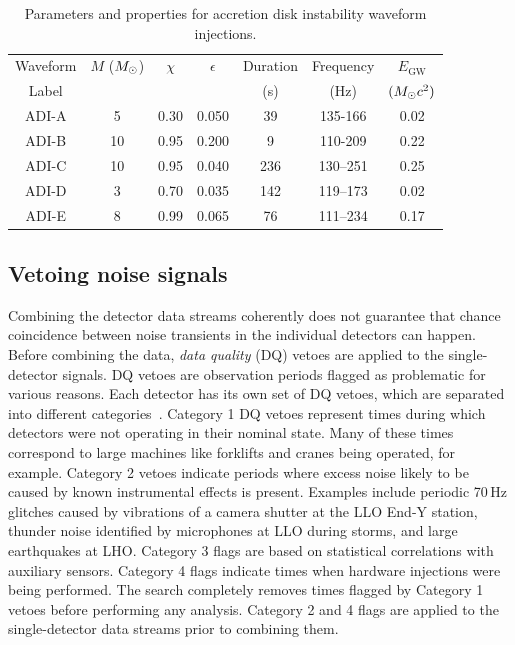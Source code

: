 \begin{table}[h!]
	\centering
	\caption
  {Parameters and properties for accretion disk instability waveform injections.
  \label{tab:adi}}
	\begin{tabular}{c c c c c c c}
		\hline
		Waveform & $M$ ($M_{\odot}$) & $\chi$ & $\epsilon$ & Duration & Frequency & $E_{\text{GW}}$ \\
		Label &  &  &  & (s) & (Hz) & $(M_{\odot} c^2)$ \\
		\hline
  	\hline
    ADI-A & 5 & 0.30 & 0.050 & 39 & 135-166 & 0.02 \\
    ADI-B & 10 & 0.95 & 0.200 & 9 & 110-209 & 0.22 \\
    ADI-C & 10 & 0.95 & 0.040 & 236 & 130–251 & 0.25 \\
    ADI-D & 3 & 0.70 & 0.035 & 142 & 119–173 & 0.02 \\
    ADI-E & 8 & 0.99 & 0.065 & 76 & 111–234 & 0.17 \\
		\hline
	\end{tabular}
\end{table}


\subsection{Vetoing noise signals}

Combining the detector data streams coherently does not guarantee that chance coincidence between noise transients in the individual detectors can happen.
Before combining the data, \textit{data quality} (DQ) vetoes are applied to the single-detector signals.
DQ vetoes are observation periods flagged as problematic for various reasons.
Each detector has its own set of DQ vetoes, which are separated into different categories~\citep{Davis_2021, Davis_2021b}.
Category 1 DQ vetoes represent times during which detectors were not operating in their nominal state.
Many of these times correspond to large machines like forklifts and cranes being operated, for example.
Category 2 vetoes indicate periods where excess noise likely to be caused by known instrumental effects is present.
Examples include periodic 70\,Hz glitches caused by vibrations of a camera shutter at the LLO End-Y station, thunder noise identified by microphones at LLO during storms, and large earthquakes at LHO.
Category 3 flags are based on statistical correlations with auxiliary sensors.
Category 4 flags indicate times when hardware injections were being performed.
The \xpip search completely removes times flagged by Category 1 vetoes before performing any analysis.
Category 2 and 4 flags are applied to the single-detector data streams prior to combining them.


